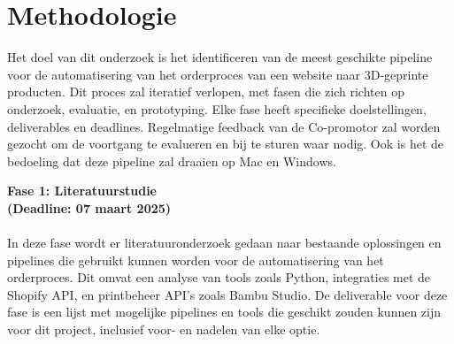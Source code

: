 





\section{Methodologie}%
\label{sec:methodologie}

Het doel van dit onderzoek is het identificeren van de meest geschikte pipeline voor de automatisering van het orderproces van een website naar 3D-geprinte producten. Dit proces zal iteratief verlopen, met fasen die zich richten op onderzoek, evaluatie, en prototyping. Elke fase heeft specifieke doelstellingen, deliverables en deadlines. Regelmatige feedback van de Co-promotor zal worden gezocht om de voortgang te evalueren en bij te sturen waar nodig. Ook is het de bedoeling dat deze pipeline zal draaien op Mac en Windows.
\vspace{2em}

\textbf{Fase 1: Literatuurstudie}\\
\textbf{(Deadline: 07 maart 2025)}\\\\
In deze fase wordt er literatuuronderzoek gedaan naar bestaande oplossingen en pipelines die gebruikt kunnen worden voor de automatisering van het orderproces. Dit omvat een analyse van tools zoals Python, integraties met de Shopify API, en printbeheer API's zoals Bambu Studio. De deliverable voor deze fase is een lijst met mogelijke pipelines en tools die geschikt zouden kunnen zijn voor dit project, inclusief voor- en nadelen van elke optie.
\vspace{2em}

